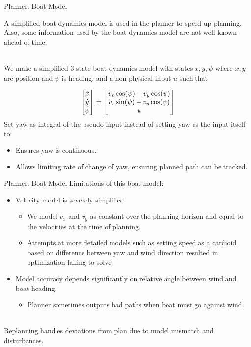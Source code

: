 \documentclass[10pt,xcolor={table,dvipsnames},t]{beamer}
\begin{document}
\begin{frame}{Planner: Boat Model}

    A simplified boat dynamics model is used in the planner to speed up planning.
    Also, some information used by the boat dynamics model are not well known 
    ahead of time.
    
    \hfill\\
    We make a simplified 3 state boat dynamics model with states \(x, y, \psi\) where 
    \(x, y\) are position and \(\psi\) is heading, and a non-physical input \(u\) 
    such that 
    
    \begin{equation}
        \mqty[\dot{x} \\ \dot{y} \\ \dot{\psi}]
         = \mqty[v_x \cos(\psi) - v_y \cos(\psi) \\ 
         v_x \sin(\psi) + v_y\cos(\psi) \\ 
         u]
    \end{equation}
    Set yaw as integral of the pseudo-input instead of setting yaw as the input itself to:
    \begin{itemize}
        \item Ensures yaw is continuous.
        \item Allows limiting rate of change of yaw, ensuring planned path can be tracked.
    \end{itemize}

\end{frame}

\begin{frame}{Planner: Boat Model}
    Limitations of this boat model:
    \begin{itemize}
        \item Velocity model is severely simplified.
            \begin{itemize}
                \item We model \(v_x\) and \(v_y\) as constant over the planning horizon and equal to the velocities at the time of planning.
                \item Attempts at more detailed models such as setting speed as a cardioid based on difference between yaw and wind direction resulted in optimization failing to solve.
            \end{itemize}
        \item Model accuracy depends significantly on relative angle between wind and boat heading.
        \begin{itemize}
            \item Planner sometimes outputs bad paths when boat must go against wind.
        \end{itemize}
    \end{itemize}
    
    \hfill\\
    Replanning handles deviations from plan due to model mismatch and disturbances.
\end{frame}
\end{document}
